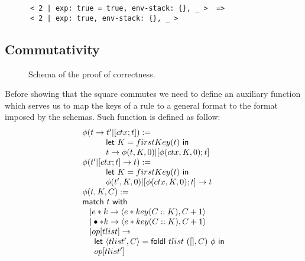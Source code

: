 \documentclass{article}[12pt,a4paper]
\theoremstyle{definition}
\begin{document}
\begin{Verbatim}
      < 2 | exp: true = true, env-stack: {}, _ >  =>
      < 2 | exp: true, env-stack: {}, _ >
\end{Verbatim}

\subsection{Commutativity}
\begin{figure}
  \centering
  \caption{ Schema of the proof of correctness. }
  \label{fig:square}
\end{figure}

Before showing that the square commutes we need to define an auxiliary function
which serves us to map the keys of a rule to a general format to the format
imposed by the schemas. Such function is defined as follow:
\[
  \begin{array}{l}
    \phi(t \rightarrow t' | [ctx; t]):= \\
    \hspace{1cm}\mathsf{let}~K=firstKey(t)~\mathsf{in}\\
    \hspace{1cm}t \rightarrow \phi(t, K,0) | [\phi(ctx,K,0); t]\\
    \phi(t' | [ctx; t]  \rightarrow t ):= \\
    \hspace{1cm}\mathsf{let}~K=firstKey(t)~\mathsf{in}\\
    \hspace{1cm}\phi(t',K,0) | [\phi(ctx,K,0);t]\rightarrow t\\
    \phi(t, K, C ):= \\
    \mathsf{match}~t~\mathsf{with}\\
    \hspace{0.3cm}| e * k \rightarrow \langle e * key(C::K), C+1 \rangle\\
    \hspace{0.3cm}| \bullet * k \rightarrow \langle e * key(C::K), C+1 \rangle \\
    \hspace{0.3cm}| op[tlist] \rightarrow \\
    \hspace{0.5cm} \mathsf{let}~\langle tlist', C\rangle = \mathsf{foldl}~tlist~([], C)~\phi~\mathsf{in}\\
    \hspace{0.5cm} op[tlist']
  \end{array}
\]
\end{document}
